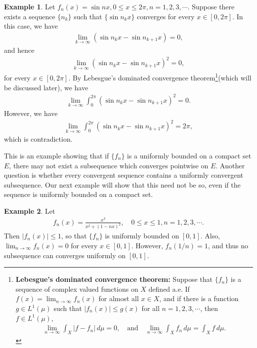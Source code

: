 \documentclass[10pt]{book}
\theoremstyle{definition}
\newtheorem{example}{Example}[chapter]
\numberwithin{equation}{chapter}
\begin{document}
\begin{example}
Let $f_n(x) = \sin nx, 0 \leq x \leq 2\pi, n = 1,2,3,\cdots$. Suppose there exists a sequence $\{n_k\}$ such that $\{\sin n_kx\}$ converges for every $x \in [0,2\pi]$. In this case, we have
\begin{align*}
    \lim_{k\to\infty} \left(\sin n_kx - \sin n_{k+1}x\right) = 0,
\end{align*}
and hence
\begin{align*}
    \lim_{k\to\infty} \left(\sin n_kx - \sin n_{k+1}x\right)^2 = 0,
\end{align*}
for every $x \in [0,2\pi]$. By Lebesgue's dominated convergence theorem\footnote{{\bf Lebesgue's dominated convergence theorem:} Suppose that $\{f_n\}$ is a sequence of complex valued functions on $X$ defined a.e. If $f(x) = \lim_{n\to\infty} f_n(x)$ for almost all $x \in X$, and if there is a function $g \in L^1(\mu)$ such that $\left|f_n(x)\right| \leq g(x)$ for all $n = 1,2,3,\cdots$, then $f \in L^1(\mu)$,
\begin{align*}
    \lim_{n\to\infty} \int_X \left|f - f_n\right|\,d\mu = 0,\quad \text{and} \quad \lim_{n\to\infty} \int_X f_n\,d\mu = \int_X f\,d\mu.
\end{align*}}(which will be discussed later), we have
\begin{align*}
    \lim_{k\to\infty} \int^{2\pi}_0 \left(\sin n_kx - \sin n_{k+1}x\right)^2 = 0.
\end{align*}
However, we have
\begin{align*}
    \lim_{k\to\infty} \int^{2\pi}_0 \left(\sin n_kx - \sin n_{k+1}x\right)^2 = 2\pi,
\end{align*}
which is contradiction.
\end{example}

\medskip

This is an example showing that if $\{f_n\}$ is a uniformly bounded on a compact set $E$, there may not exist a subsequence which converges pointwise on $E$. Another question is whether every convergent sequence contains a
uniformly convergent subsequence. Our next example will show that this need not be so, even if the sequence is uniformly bounded on a compact set.

\medskip

\begin{example}\label{ex_64}
Let
\begin{align*}
    f_n(x) = \frac{x^2}{x^2 + (1 - nx)^2}, \quad 0 \leq x \leq 1, n = 1,2,3,\cdots.
\end{align*}
Then $\left|f_n(x)\right| \leq 1$, so that $\{f_n\}$ is uniformly bounded on $[0,1]$. Also, $\lim_{n\to\infty} f_n(x) = 0$ for every $x \in [0,1]$. However, $f_n(1/n) = 1$, and thus no subsequence can converges uniformly on $[0,1]$.
\end{example}
\end{document}
